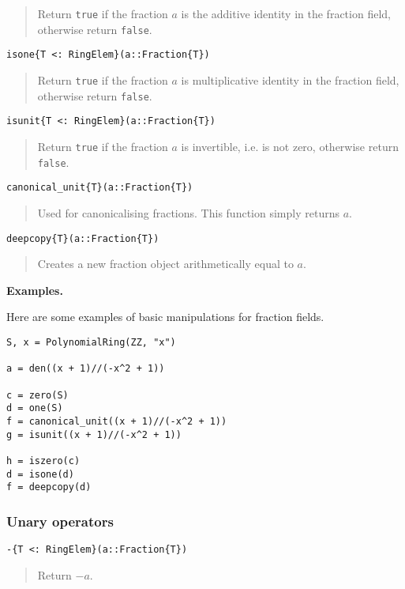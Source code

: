 \documentclass[a4paper,10pt]{article}
\newcommand{\code}{\lstinline}
\newcommand{\desc}[1]{\vspace{-3mm}\begin{quote}#1\end{quote}}
\begin{document}
\desc{Return \code{true} if the fraction $a$ is the additive identity in the
fraction field, otherwise return \code{false}.}

\begin{lstlisting}
isone{T <: RingElem}(a::Fraction{T})
\end{lstlisting}

\desc{Return \code{true} if the fraction $a$ is multiplicative identity in the
fraction field, otherwise return \code{false}.}

\begin{lstlisting}
isunit{T <: RingElem}(a::Fraction{T})
\end{lstlisting}

\desc{Return \code{true} if the fraction $a$ is invertible, i.e. is not zero,
otherwise return \code{false}.}

\begin{lstlisting}
canonical_unit{T}(a::Fraction{T})
\end{lstlisting}

\desc{Used for canonicalising fractions. This function simply returns $a$.}

\begin{lstlisting}
deepcopy{T}(a::Fraction{T})
\end{lstlisting}

\desc{Creates a new fraction object arithmetically equal to $a$.}

\textbf{Examples.}

Here are some examples of basic manipulations for fraction fields.

\begin{lstlisting}
S, x = PolynomialRing(ZZ, "x")

a = den((x + 1)//(-x^2 + 1))

c = zero(S)
d = one(S)
f = canonical_unit((x + 1)//(-x^2 + 1))
g = isunit((x + 1)//(-x^2 + 1))

h = iszero(c)
d = isone(d)
f = deepcopy(d)
\end{lstlisting}

\subsubsection{Unary operators}

\begin{lstlisting}
-{T <: RingElem}(a::Fraction{T})
\end{lstlisting}

\desc{Return $-a$.}
\end{document}
